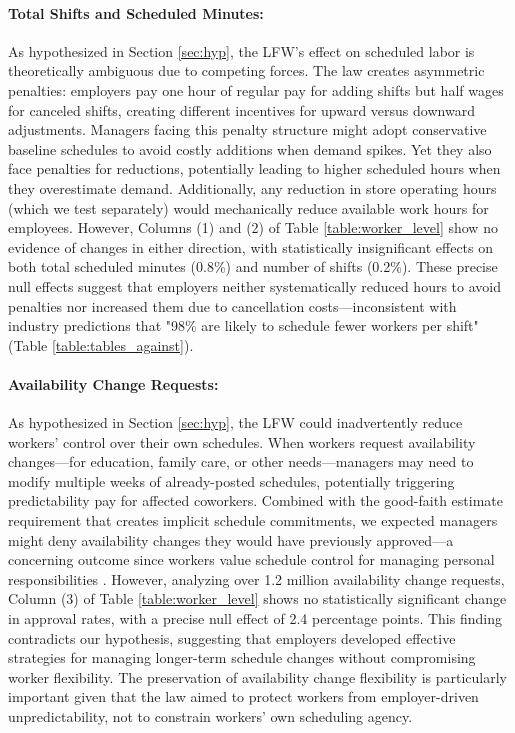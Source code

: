 \documentclass[letterpaper,11pt,leqno]{article}
\theoremstyle{paper}
\begin{document}
\paragraph{Total Shifts and Scheduled Minutes:} As hypothesized in Section \ref{sec:hyp}, the LFW's effect on scheduled labor is theoretically ambiguous due to competing forces. The law creates asymmetric penalties: employers pay one hour of regular pay for adding shifts but half wages for canceled shifts, creating different incentives for upward versus downward adjustments. Managers facing this penalty structure might adopt conservative baseline schedules to avoid costly additions when demand spikes. Yet they also face penalties for reductions, potentially leading to higher scheduled hours when they overestimate demand. Additionally, any reduction in store operating hours (which we test separately) would mechanically reduce available work hours for employees. However, Columns (1) and (2) of Table \ref{table:worker_level} show no evidence of changes in either direction, with statistically insignificant effects on both total scheduled minutes (0.8\%) and number of shifts (0.2\%). These precise null effects suggest that employers neither systematically reduced hours to avoid penalties nor increased them due to cancellation costs—inconsistent with industry predictions that "98\% are likely to schedule fewer workers per shift" (Table \ref{table:tables_against}).


\paragraph{Availability Change Requests:} As hypothesized in Section \ref{sec:hyp}, the LFW could inadvertently reduce workers' control over their own schedules. When workers request availability changes—for education, family care, or other needs—managers may need to modify multiple weeks of already-posted schedules, potentially triggering predictability pay for affected coworkers. Combined with the good-faith estimate requirement that creates implicit schedule commitments, we expected managers might deny availability changes they would have previously approved—a concerning outcome since workers value schedule control for managing personal responsibilities \citep{kelly2011changing,harknett2022who,mas2017valuing}. However, analyzing over 1.2 million availability change requests, Column (3) of Table \ref{table:worker_level} shows no statistically significant change in approval rates, with a precise null effect of 2.4 percentage points. This finding contradicts our hypothesis, suggesting that employers developed effective strategies for managing longer-term schedule changes without compromising worker flexibility. The preservation of availability change flexibility is particularly important given that the law aimed to protect workers from employer-driven unpredictability, not to constrain workers' own scheduling agency.
\end{document}
